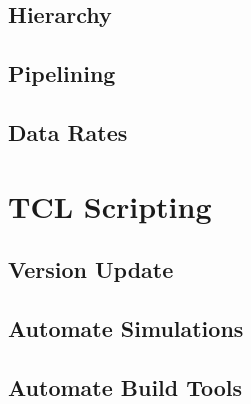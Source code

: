 \subsection{Hierarchy} 
\subsection{Pipelining}
\subsection{Data Rates}

\section{TCL Scripting}
\subsection{Version Update}
\subsection{Automate Simulations}
\subsection{Automate Build Tools}